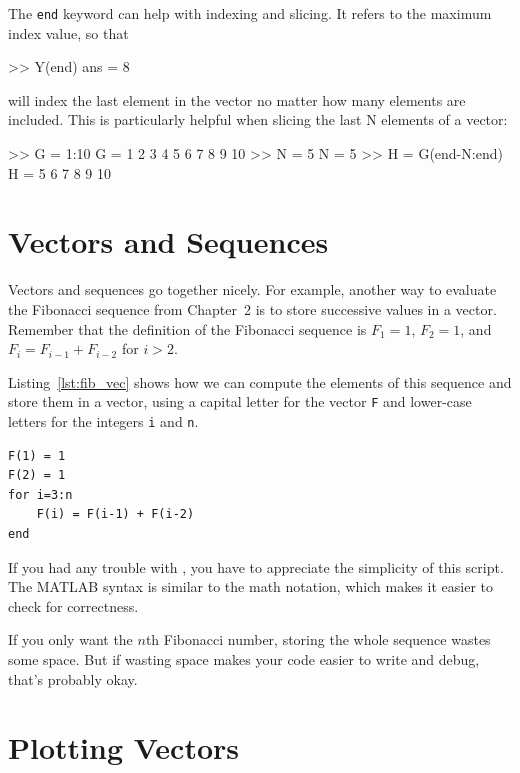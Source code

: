 The \lstinline{end} keyword can help with indexing and slicing.  It refers to the maximum index value, so that
\begin{code}
    >> Y(end)
    ans =
         8
\end{code}
will index the last element in the vector no matter how many elements are included.  This is particularly helpful when slicing the last N elements of a vector:
\begin{code}
    >> G = 1:10
    G =
         1     2     3     4     5     6     7     8     9    10
    >> N = 5
    N =
         5
    >> H = G(end-N:end)
    H =
         5     6     7     8     9    10
\end{code}

\section{Vectors and Sequences}
\label{vecseq}


Vectors and sequences go together nicely.
For example, another way to evaluate the Fibonacci sequence from Chapter~2 is to
store successive values in a vector.  Remember that the definition of the
Fibonacci sequence is $F_1 = 1$, $F_2 = 1$, and
$F_{i} = F_{i-1} + F_{i-2}$ for $i > 2$.

Listing~\ref{lst:fib_vec} shows how we can compute the elements of this sequence and store them in a vector, using a capital letter for the vector \lstinline{F}
and lower-case letters for the integers \lstinline{i} and \lstinline{n}.

\begin{lstlisting}[caption={Calculating the Fibonacci sequence using a vector}, label={lst:fib_vec}]
F(1) = 1
F(2) = 1
for i=3:n
    F(i) = F(i-1) + F(i-2)
end
\end{lstlisting}

If you had any trouble with , you have to
appreciate the simplicity of this script.  The MATLAB syntax is
similar to the math notation, which makes it easier to check for
correctness.

If you only want the $n$th Fibonacci number, storing
the whole sequence wastes some space.  But if wasting space
makes your code easier to write and debug, that's probably okay.


\section{Plotting Vectors}


